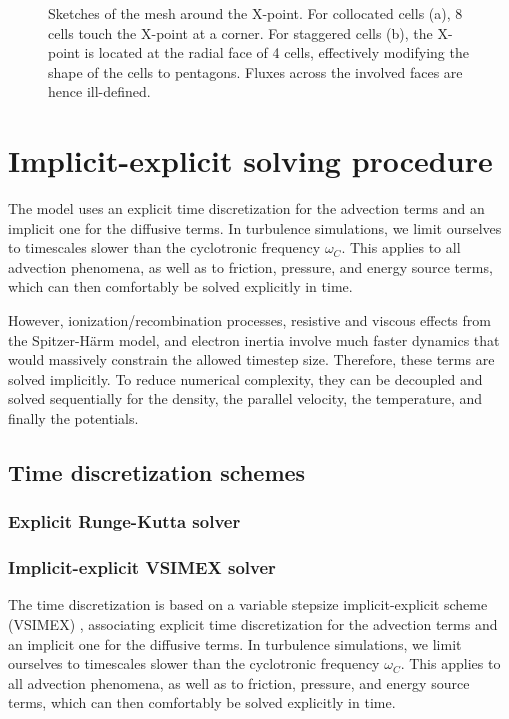 \begin{figure}[H]
\begin{subfigure}[t]{0.39\textwidth}
		\label{fig:StaggeredXpoint}
	\end{subfigure}
	\caption{ Sketches of the mesh around the X-point. For collocated cells (a), 8 cells touch the X-point at a corner. For staggered cells (b), the X-point is located at the radial face of 4 cells, effectively modifying the shape of the cells to pentagons. Fluxes across the involved faces are hence ill-defined. }
	\label{fig:XpointDiscretization}
\end{figure}




\section{Implicit-explicit solving procedure}

The model uses an explicit time discretization for the advection terms and an implicit one for the diffusive terms. In turbulence simulations, we limit ourselves to timescales slower than the cyclotronic frequency $\omega_C$. This applies to all advection phenomena, as well as to friction, pressure, and energy source terms, which can then comfortably be solved explicitly in time. \newline

However, ionization/recombination processes, resistive and viscous effects from the Spitzer-Härm model, and electron inertia involve much faster dynamics that would massively constrain the allowed timestep size. Therefore, these terms are solved implicitly. To reduce numerical complexity, they can be decoupled and solved sequentially for the density, the parallel velocity, the temperature, and finally the potentials. 

\subsection{Time discretization schemes}


\subsubsection{Explicit Runge-Kutta solver}


\subsubsection{Implicit-explicit VSIMEX solver}

The time discretization is based on a variable stepsize implicit-explicit scheme (VSIMEX) \cite{wang2008variable}, associating explicit time discretization for the advection terms and an implicit one for the diffusive terms. In turbulence simulations, we limit ourselves to timescales slower than the cyclotronic frequency $\omega_C$. This applies to all advection phenomena, as well as to friction, pressure, and energy source terms, which can then comfortably be solved explicitly in time. \newline


